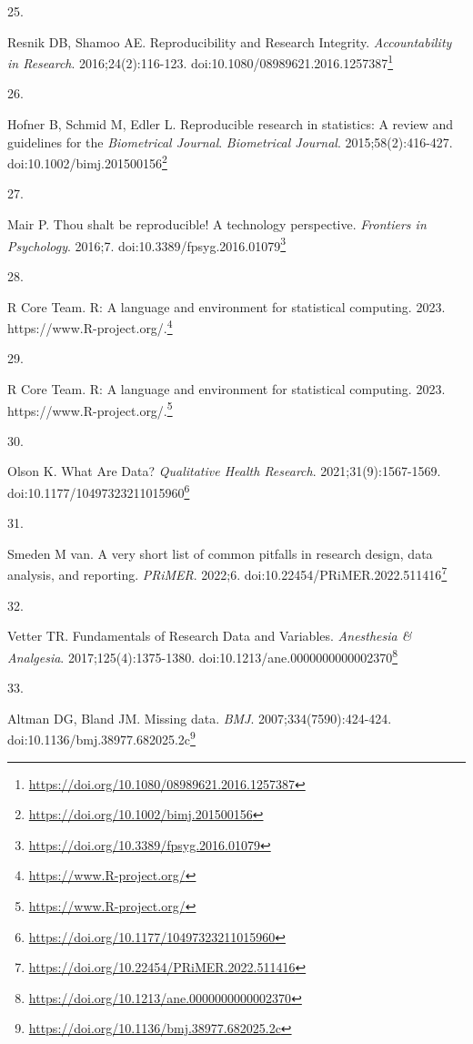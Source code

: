 \documentclass[
  a4paper,
]{book}
\newlength{\cslhangindent}
\newlength{\csllabelwidth}
\newlength{\cslentryspacingunit} %
\newenvironment{CSLReferences}[2] %
 {%
  \setlength{\parindent}{0pt}
  \ifodd #1
  \let\oldpar\par
  \def\par{\hangindent=\cslhangindent\oldpar}
  \fi
  \setlength{\parskip}{#2\cslentryspacingunit}
 }%
 {}
\newcommand{\CSLLeftMargin}[1]{\parbox[t]{\csllabelwidth}{#1}}
\newcommand{\CSLRightInline}[1]{\parbox[t]{\linewidth - \csllabelwidth}{#1}\break}
\renewcommand{\href}[2]{#2\footnote{\url{#1}}}
\begin{document}
\begin{CSLReferences}{0}{0}
\leavevmode{}%
\CSLLeftMargin{25. }%
\CSLRightInline{Resnik DB, Shamoo AE. Reproducibility and Research Integrity. \emph{Accountability in Research}. 2016;24(2):116-123. doi:\href{https://doi.org/10.1080/08989621.2016.1257387}{10.1080/08989621.2016.1257387}}

\leavevmode{}%
\CSLLeftMargin{26. }%
\CSLRightInline{Hofner B, Schmid M, Edler L. Reproducible research in statistics: A review and guidelines for the {\emph{Biometrical Journal}}. \emph{Biometrical Journal}. 2015;58(2):416-427. doi:\href{https://doi.org/10.1002/bimj.201500156}{10.1002/bimj.201500156}}

\leavevmode{}%
\CSLLeftMargin{27. }%
\CSLRightInline{Mair P. Thou shalt be reproducible! A technology perspective. \emph{Frontiers in Psychology}. 2016;7. doi:\href{https://doi.org/10.3389/fpsyg.2016.01079}{10.3389/fpsyg.2016.01079}}

\leavevmode{}%
\CSLLeftMargin{28. }%
\CSLRightInline{R Core Team. R: A language and environment for statistical computing. 2023. \href{https://www.R-project.org/}{https://www.R-project.org/.}}

\leavevmode{}%
\CSLLeftMargin{29. }%
\CSLRightInline{R Core Team. R: A language and environment for statistical computing. 2023. \href{https://www.R-project.org/}{https://www.R-project.org/.}}

\leavevmode{}%
\CSLLeftMargin{30. }%
\CSLRightInline{Olson K. What Are Data? \emph{Qualitative Health Research}. 2021;31(9):1567-1569. doi:\href{https://doi.org/10.1177/10497323211015960}{10.1177/10497323211015960}}

\leavevmode{}%
\CSLLeftMargin{31. }%
\CSLRightInline{Smeden M van. A very short list of common pitfalls in research design, data analysis, and reporting. \emph{PRiMER}. 2022;6. doi:\href{https://doi.org/10.22454/PRiMER.2022.511416}{10.22454/PRiMER.2022.511416}}

\leavevmode{}%
\CSLLeftMargin{32. }%
\CSLRightInline{Vetter TR. Fundamentals of Research Data and Variables. \emph{Anesthesia \& Analgesia}. 2017;125(4):1375-1380. doi:\href{https://doi.org/10.1213/ane.0000000000002370}{10.1213/ane.0000000000002370}}

\leavevmode{}%
\CSLLeftMargin{33. }%
\CSLRightInline{Altman DG, Bland JM. Missing data. \emph{BMJ}. 2007;334(7590):424-424. doi:\href{https://doi.org/10.1136/bmj.38977.682025.2c}{10.1136/bmj.38977.682025.2c}}


\end{CSLReferences}
\end{document}
